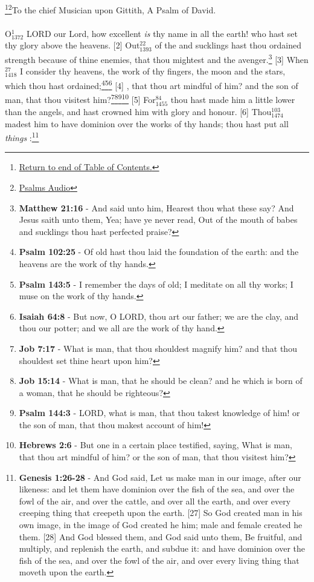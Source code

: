 \footnote{\textcolor[cmyk]{0.99998,1,0,0}{\hyperlink{TOC}{Return to end of Table of Contents.}}}\footnote{\href{https://audiobible.com/bible/bible.html}{\textcolor[cmyk]{0.99998,1,0,0}{Psalms Audio}}}\textcolor[cmyk]{0.99998,1,0,0}{To the chief Musician upon Gittith, A Psalm of David.}\\
\\
\textcolor[cmyk]{0.99998,1,0,0}{O\textcolor{jungle}{$_{1372}^{1}$} LORD our Lord, how excellent \emph{is} thy name in all the earth! who hast set thy glory above the heavens.}
[2] \textcolor[cmyk]{0.99998,1,0,0}{Out\textcolor{jungle}{$_{1393}^{22}$} of the  and sucklings hast thou ordained strength because of thine enemies, that thou mightest  and the avenger.}\footnote{\textbf{Matthew 21:16} -  And said unto him, Hearest thou what these say? And Jesus saith unto them, Yea; have ye never read, Out of the mouth of babes and sucklings thou hast perfected praise?}
[3] \textcolor[cmyk]{0.99998,1,0,0}{When\textcolor{jungle}{$_{1418}^{27}$} I consider thy heavens, the work of thy fingers, the moon and the stars, which thou hast ordained;}\footnote{\textbf{Psalm 102:25} - Of old hast thou laid the foundation of the earth: and the heavens are the work of thy hands.}\footnote{\textbf{Psalm 143:5} - I remember the days of old; I meditate on all thy works; I muse on the work of thy hands.}\footnote{\textbf{Isaiah 64:8} - But now, O LORD, thou art our father; we are the clay, and thou our potter; and we all are the work of thy hand.}
[4] \textcolor[cmyk]{0.99998,1,0,0}{, that thou art mindful of him? and the son of man, that thou visitest him?}\footnote{\textbf{Job 7:17} - What is man, that thou shouldest magnify him? and that thou shouldest set thine heart upon him?}\footnote{\textbf{Job 15:14} - What is man, that he should be clean? and he which is born of a woman, that he should be righteous?}\footnote{\textbf{Psalm 144:3} - LORD, what is man, that thou takest knowledge of him! or the son of man, that thou makest account of him!}\footnote{\textbf{Hebrews 2:6} - But one in a certain place testified, saying, What is man, that thou art mindful of him? or the son of man, that thou visitest him?}
[5] \textcolor[cmyk]{0.99998,1,0,0}{For\textcolor{jungle}{$_{1455}^{84}$} thou hast made him a little lower than the angels, and hast crowned him with glory and honour.}
[6] \textcolor[cmyk]{0.99998,1,0,0}{Thou\textcolor{jungle}{$_{1474}^{103}$} madest him to have dominion over the works of thy hands; thou hast put all \emph{things} :}\footnote{\textbf{Genesis 1:26-28} - And God said, Let us make man in our image, after our likeness: and let them have dominion over the fish of the sea, and over the fowl of the air, and over the cattle, and over all the earth, and over every creeping thing that creepeth upon the earth. [27] So God created man in his own image, in the image of God created he him; male and female created he them. [28] And God blessed them, and God said unto them, Be fruitful, and multiply, and replenish the earth, and subdue it: and have dominion over the fish of the sea, and over the fowl of the air, and over every living thing that moveth upon the earth.}
